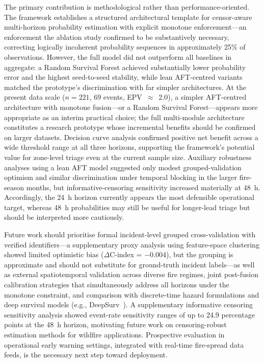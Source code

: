 \documentclass[fire,article,submit,pdftex]{../Definitions/mdpi}
\begin{document}
The primary contribution is methodological rather than performance-oriented.
The framework establishes a structured architectural template for censor-aware multi-horizon probability estimation with explicit monotone enforcement---an enforcement the ablation study confirmed to be substantively necessary, correcting logically incoherent probability sequences in approximately 25\% of observations.
However, the full model did not outperform all baselines in aggregate: a Random Survival Forest achieved substantially lower probability error and the highest seed-to-seed stability, while lean AFT-centred variants matched the prototype's discrimination with far simpler architectures.
At the present data scale ($n = 221$, 69 events, EPV~$\approx$~2.0), a simpler AFT-centred architecture with monotone fusion---or a Random Survival Forest---appears more appropriate as an interim practical choice; the full multi-module architecture constitutes a research prototype whose incremental benefits should be confirmed on larger datasets.
Decision curve analysis confirmed positive net benefit across a wide threshold range at all three horizons, supporting the framework's potential value for zone-level triage even at the current sample size.
Auxiliary robustness analyses using a lean AFT model suggested only modest grouped-validation optimism and similar discrimination under temporal blocking in the larger fire-season months, but informative-censoring sensitivity increased materially at 48~h.
Accordingly, the 24~h horizon currently appears the most defensible operational target, whereas 48~h probabilities may still be useful for longer-lead triage but should be interpreted more cautiously.

Future work should prioritise formal incident-level grouped cross-validation with verified identifiers---a supplementary proxy analysis using feature-space clustering showed limited optimistic bias ($\Delta$C-index = $-0.004$), but the grouping is approximate and should not substitute for ground-truth incident labels---as well as external spatiotemporal validation across diverse fire regimes, joint post-fusion calibration strategies that simultaneously address all horizons under the monotone constraint, and comparison with discrete-time hazard formulations and deep survival models (e.g., DeepSurv~\cite{Katzman2018}).
A supplementary informative censoring sensitivity analysis showed event-rate sensitivity ranges of up to 24.9 percentage points at the 48~h horizon, motivating future work on censoring-robust estimation methods for wildfire applications.
Prospective evaluation in operational early warning settings, integrated with real-time fire-spread data feeds, is the necessary next step toward deployment.
\end{document}
